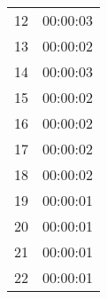 \documentclass[10pt,twoside,english]{scrartcl}
\begin{document}
\begin{table}[H]
\begin{tabular}{rr}
12 & {\color{light_gray}00:00:0}3\\
13 & {\color{light_gray}00:00:0}2\\
14 & {\color{light_gray}00:00:0}3\\
15 & {\color{light_gray}00:00:0}2\\
16 & {\color{light_gray}00:00:0}2\\
17 & {\color{light_gray}00:00:0}2\\
18 & {\color{light_gray}00:00:0}2\\
19 & {\color{light_gray}00:00:0}1\\
20 & {\color{light_gray}00:00:0}1\\
21 & {\color{light_gray}00:00:0}1\\
22 & {\color{light_gray}00:00:0}1\\
\hline 
\end{tabular}


\end{table}
\end{document}
